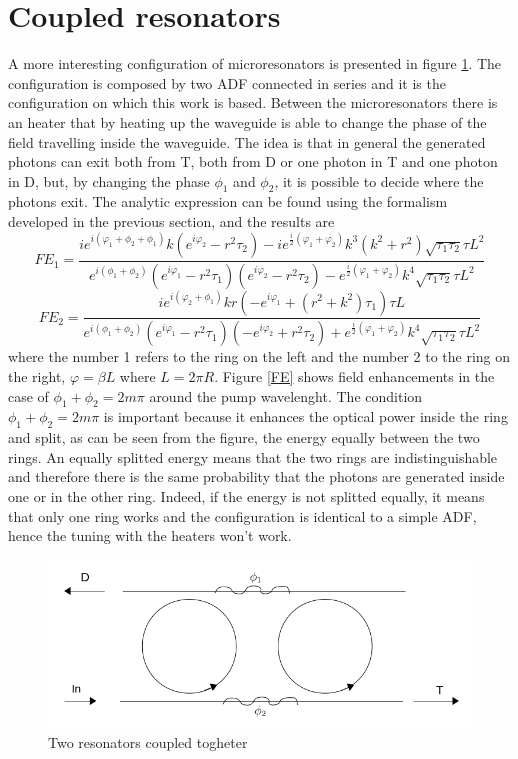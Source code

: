 \section{Coupled resonators} 
A more interesting configuration of microresonators is presented in figure \ref{resonatorcoupled}. The configuration is composed by two ADF connected in series and it is the configuration on which this work is based. Between the microresonators there is an heater that by heating up the waveguide is able to change the phase of the field travelling inside the waveguide. The idea is that in general the generated photons can exit both from T, both from D or one photon in T and one photon in D, but, by changing the phase $\phi_1$ and $\phi_2$, it is possible to decide where the photons exit. The analytic expression can be found using the formalism developed in the previous section, and the results are
\[FE_1 = \frac{ie^{i(\varphi_1+\phi_2+\phi_1)}k (e^{i\varphi_2}-r^2\tau_2)-ie^{\frac{i}{2}(\varphi_1+\varphi_2)}k^3(k^2+r^2)\sqrt{\tau_1\tau_2}\tau L^2}{e^{i(\phi_1+\phi_2)}(e^{i\varphi_1}-r^2\tau_1)(e^{i\varphi_2}-r^2\tau_2)-e^{\frac{i}{2}(\varphi_1+\varphi_2)}k^4\sqrt{\tau_1\tau_2}\tau L^2}\]
\[FE_2 = \frac{ie^{i(\varphi_2+\phi_1)}kr (-e^{i\varphi_1}+(r^2+k^2)\tau_1)\tau L}{e^{i(\phi_1+\phi_2)}(e^{i\varphi_1}-r^2\tau_1)(-e^{i\varphi_2}+r^2\tau_2)+e^{\frac{i}{2}(\varphi_1+\varphi_2)}k^4\sqrt{\tau_1\tau_2}\tau L^2}\]
where the number 1 refers to the ring on the left and the number 2 to the ring on the right, $\varphi = \beta L$ where $L=2\pi R$. Figure \ref{FE} shows field enhancements in the case of $\phi_1 + \phi_2 = 2m\pi$ around the pump wavelenght. The condition $\phi_1 + \phi_2 = 2m\pi$ is important because it enhances the optical power inside the ring and split, as can be seen from the figure, the energy equally between the two rings. An equally splitted energy means that the two rings are indistinguishable and therefore there is the same probability that the photons are generated inside one or in the other ring. Indeed, if the energy is not splitted equally, it means that only one ring works and the configuration is identical to a simple ADF, hence the tuning with the heaters won't work. 
\begin{figure}
\centering
\includegraphics[width = .7\textwidth]{img/coupled}
\caption{Two resonators coupled togheter}
\label{resonatorcoupled}
\end{figure}

